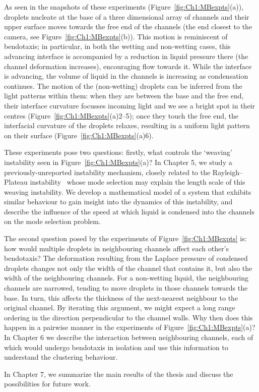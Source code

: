 As seen in the snapshots of these experiments (Figure~\ref{fig:Ch1:MBexpts}(a)), droplets nucleate at the base of a three dimensional array of channels and their upper surface moves towards the free end of the channels (the end closest to the camera, see Figure~\ref{fig:Ch1:MBexpts}(b)). This motion is reminiscent of bendotaxis; in particular, in both the wetting and non-wetting cases, this advancing interface is accompanied by a reduction in liquid pressure there (the channel deformation increases), encouraging flow towards it. While the interface is advancing, the volume of liquid in the channels is increasing as condensation continues. The motion of the (non-wetting) droplets can be inferred from the light patterns within them: when they are between the base and the free end, their interface curvature focusses incoming light and we see a bright spot in their centres (Figure~\ref{fig:Ch1:MBexpts}(a)2--5); once they touch the free end, the interfacial curvature of the droplets relaxes, resulting in a uniform light pattern on their surface (Figure~\ref{fig:Ch1:MBexpts}(a)6).

These experiments pose two questions: firstly, what controls the `weaving' instability seen in Figure~\ref{fig:Ch1:MBexpts}(a)? In Chapter 5, we study a previously-unreported instability mechanism, closely related to the Rayleigh--Plateau instability~\citep{Plateau1873, Rayleigh1879PRSL, Rayleigh1892PhilosMag}  whose mode selection may explain the length scale of this weaving instability.  We develop a mathematical model of a system that exhibits similar behaviour to gain insight into the dynamics of this instability, and describe the influence of the speed at which liquid is condensed into the channels on the mode selection problem.

The second question posed by the experiments of Figure~\ref{fig:Ch1:MBexpts} is: how would multiple droplets in neighbouring channels affect each other's bendotaxis? The deformation resulting from the Laplace pressure of condensed droplets changes not only the width of the channel that contains it, but also the width of the neighbouring channels. For a non-wetting liquid, the neighbouring channels are narrowed, tending to move droplets in those channels towards the base. In turn, this affects the thickness of the next-nearest neighbour to the original channel. By iterating this argument, we might expect a long range ordering in the direction perpendicular to the channel walls. Why then does this happen in a pairwise manner in the experiments of Figure~\ref{fig:Ch1:MBexpts}(a)? In Chapter 6 we describe the interaction between neighbouring channels, each of which would undergo bendotaxis in isolation and use this information to understand the clustering behaviour.

In Chapter 7, we summarize the main results of the thesis and discuss the possibilities for future work.
